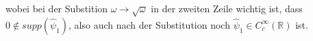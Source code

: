 
wobei bei der Substition $\omega \to \sqrt{\omega}$ in der zweiten Zeile wichtig ist, dass $0 \notin supp (\hat\psi_1)$, also auch nach der Substitution noch $\hat\psi_1 \in C_c^\infty (\mathbb{R})$ ist.


